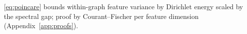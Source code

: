 \documentclass{article}
\newtheorem{lemma}{Lemma}
\theoremstyle{definition}
\begin{document}
\eqref{eq:poincare} bounds within-graph feature variance by Dirichlet energy scaled by the spectral gap; proof by Courant--Fischer per feature dimension (Appendix~\ref{app:proofs}).

\end{document}
